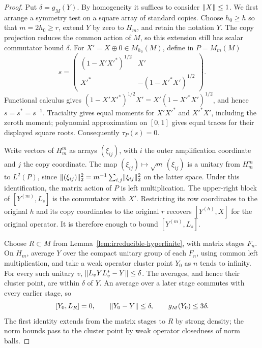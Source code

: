 \begin{proof}
Put \(\delta=g_M(Y)\).  By homogeneity it suffices to consider
\(\lVert X\rVert\leq1\).  We first arrange a symmetry test on a square
array of standard copies.  Choose \(h_0\geq h\) so that
\(m=2h_0\geq r\), extend \(Y\) by zero to \(H_m\), and retain the
notation \(Y\).  The copy projection reduces the common action of
\(M\), so this extension still has scalar commutator bound \(\delta\).
For \(X'=X\oplus0\in M_{h_0}(M)\), define in \(P=M_m(M)\)
\[
 s=
 \begin{pmatrix}
  (1-X'X'^*)^{1/2}&X'\\
  X'^*&-(1-X'^*X')^{1/2}
 \end{pmatrix}.
\]
Functional calculus gives
\((1-X'X'^*)^{1/2}X'=X'(1-X'^*X')^{1/2}\), and hence
\(s=s^*=s^{-1}\).  Traciality gives equal moments for
\(X'X'^*\) and \(X'^*X'\), including the zeroth moment; polynomial
approximation on \([0,1]\) gives equal traces for their displayed
square roots.  Consequently \(\tau_P(s)=0\).

Write vectors of \(H_m^m\) as arrays \((\xi_{ij})\), with \(i\)
the outer amplification coordinate and \(j\) the copy coordinate.
The map \((\xi_{ij})\mapsto\sqrt m\,(\xi_{ij})\) is a unitary from
\(H_m^m\) to \(L^2(P)\), since
\(\lVert(\xi_{ij})\rVert_2^2=m^{-1}\sum_{i,j}\lVert\xi_{ij}\rVert_2^2\)
on the latter space.  Under this identification, the matrix action
of \(P\) is left multiplication.  The upper-right block of
\([Y^{(m)},L_s]\) is the commutator with \(X'\).  Restricting its
row coordinates to the original \(h\) and its copy coordinates to
the original \(r\) recovers \([Y^{(h)},X]\) for the original operator.
It is therefore enough to bound \([Y^{(m)},L_s]\).

Choose \(R\subset M\) from Lemma~\ref{lem:irreducible-hyperfinite},
with matrix stages \(F_n\).  On \(H_m\), average \(Y\) over the compact
unitary group of each \(F_n\), using common left multiplication,
and take a weak operator cluster point \(Y_0\) as \(n\) tends to
infinity.  For every such unitary \(v\),
\(\lVert L_vYL_v^*-Y\rVert\leq\delta\).  The averages, and hence their
cluster point, are within \(\delta\) of \(Y\).  An average over a
later stage commutes with every earlier stage, so
\[
 [Y_0,L_R]=0,\qquad
 \lVert Y_0-Y\rVert\leq\delta,\qquad g_M(Y_0)\leq3\delta.
\]
The first identity extends from the matrix stages to \(R\) by strong
density; the norm bounds pass to the cluster point by weak operator
closedness of norm balls.


\end{proof}
